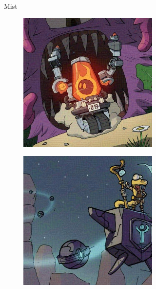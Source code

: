 \documentclass{article}
\begin{document}
\begin{figure}[h]
\begin{subfigure}[t]{\textwidth}
\begin{subfigure}[b]{0.24\textwidth}
     \end{subfigure}
    \caption{Mist}
    \vspace{0.5em}
    \end{subfigure}
    \begin{subfigure}[t]{\textwidth}
        \begin{subfigure}[b]{0.24\textwidth}
         \centering
         \includegraphics[width=\textwidth]{plots/process/antidb/0000.jpeg}
     \end{subfigure}
     \hfill
     \begin{subfigure}[b]{0.24\textwidth}
         \centering
         \includegraphics[width=\textwidth]{plots/process/antidb/0001.jpeg}

\end{subfigure}
\end{subfigure}
\end{figure}
\end{document}
